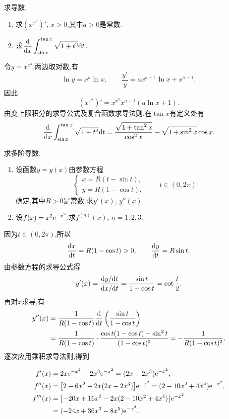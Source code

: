 \documentclass{ctexart}
\begin{document}
\begin{problem}[3.(10\songti{分})]
求导数.
\begin{enumerate}[label=\tbf{(\alph*)},leftmargin=*,topsep=0pt,parsep=0pt,itemsep=0pt,partopsep=0pt]
\item 求$\left(x^{x^a}\right)'$, $x>0$,其中$a>0$是常数.
\item 求$\displaystyle\dfrac{\mathrm{d}}{\mathrm{d} x}\int_{\sin x}^{\tan x}\sqrt{1+t^2}\mathrm{d} t$.
\end{enumerate}
\end{problem}
\begin{solution}
 令$y=x^{x^a}$,两边取对数,有
\[
\ln y=x^a\ln x,\qquad
\dfrac{y'}y=ax^{a-1}\ln x+x^{a-1}.
\]
因此
\[
{\left(x^{x^a}\right)'=x^{x^a}x^{a-1}(a\ln x+1).}
\]
 由变上限积分的求导公式及复合函数求导法则,在$\tan x$有定义处有
\[
{\dfrac{\mathrm{d}}{\mathrm{d} x}\int_{\sin x}^{\tan x}\sqrt{1+t^2}\mathrm{d} t
=\dfrac{\sqrt{1+\tan^2x}}{\cos^2x}
-\sqrt{1+\sin^2x}\cos x.}
\]
\end{solution}

\begin{problem}[4.(10\songti{分})]
求多阶导数.
\begin{enumerate}[label=\tbf{(\alph*)},leftmargin=*,topsep=0pt,parsep=0pt,itemsep=0pt,partopsep=0pt]
\item 设函数$y=y(x)$由参数方程
\[\begin{cases}x=R(t-\sin t),\\ y=R(1-\cos t),\end{cases}\qquad t\in(0,2\pi)\]
确定,其中$R>0$是常数.求$y'(x)$, $y''(x)$.
\item 设$f(x)=x^2\mathrm{e}^{-x^2}$.求$f^{(n)}(x)$, $n=1,2,3$.
\end{enumerate}
\end{problem}
\begin{solution}
 因为$t\in(0,2\pi)$,所以
\[
\dfrac{\mathrm{d} x}{\mathrm{d} t}=R(1-\cos t)>0,\qquad
\dfrac{\mathrm{d} y}{\mathrm{d} t}=R\sin t.
\]
由参数方程的求导公式得
\[
{y'(x)=\dfrac{\mathrm{d} y/\mathrm{d} t}{\mathrm{d} x/\mathrm{d} t}
=\dfrac{\sin t}{1-\cos t}=\cot\dfrac t2.}
\]
再对$x$求导,有
\[
\begin{aligned}
y''(x)
&=\dfrac1{R(1-\cos t)}\dfrac{\mathrm{d}}{\mathrm{d} t}
\left(\dfrac{\sin t}{1-\cos t}\right)\\
&=\dfrac1{R(1-\cos t)}
\cdot\dfrac{\cos t(1-\cos t)-\sin^2t}{(1-\cos t)^2}
={-\dfrac1{R(1-\cos t)^2}}.
\end{aligned}
\]
 逐次应用乘积求导法则,得到
\par\nobreak\vspace{0.4\baselineskip}
\[
\begin{aligned}
f'(x)
&=2x\mathrm{e}^{-x^2}-2x^3\mathrm{e}^{-x^2}
={(2x-2x^3)\mathrm{e}^{-x^2}},\\
f''(x)
&=\bigl[2-6x^2-2x(2x-2x^3)\bigr]\mathrm{e}^{-x^2}
={(2-10x^2+4x^4)\mathrm{e}^{-x^2}},\\
f'''(x)
&=\bigl[-20x+16x^3-2x(2-10x^2+4x^4)\bigr]\mathrm{e}^{-x^2}\\
&={(-24x+36x^3-8x^5)\mathrm{e}^{-x^2}}.
\end{aligned}
\]
\end{solution}
\end{document}
